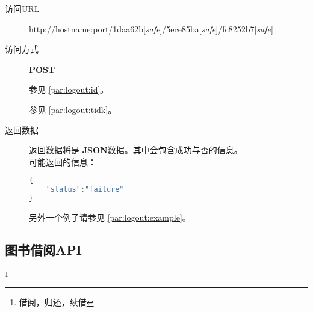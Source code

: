 \documentclass[UTF8]{article}
\def\safe{[\textit{safe}]}
\def\POST{\textbf{POST}}
\def\bfJSON{\textbf{JSON}}
\def\viaurl{\item[访问URL]}
\def\viareq#1{\item[访问方式] #1}
\def\rtdata{\item[返回数据]}
\begin{document}
        \begin{description}
            \viaurl http://hostname:port/1daa62b\safe/5ece85ba\safe/fc8252b7\safe

            \viareq \POST

            参见 \ref{par:logout:id}。

            参见 \ref{par:logout:tidk}。


            \rtdata 返回数据将是 \bfJSON 数据。其中会包含成功与否的信息。
            \\可能返回的信息：
            \begin{lstlisting}[language=JavaScript]
{
    "status":"failure"
}
            \end{lstlisting}
            另外一个例子请参见 \ref{par:logout:example}。
        \end{description}


        \subsection{图书借阅API}
        \footnote{借阅，归还，续借}
\end{document}
